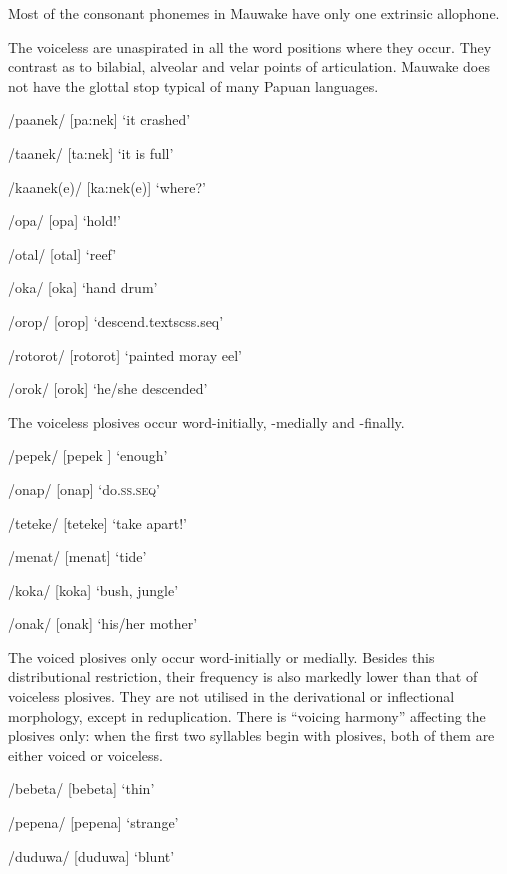 Most of the consonant phonemes in Mauwake have only one extrinsic allophone. 

The voiceless  are unaspirated in all the word positions where they occur. They contrast as to bilabial, alveolar and velar points of articulation. Mauwake does not have the glottal stop typical of many Papuan languages. 

/paanek/  [{{\textprimstress}pa:nek}]  `it crashed'

/taanek/  [{{\textprimstress}ta:nek}]  `it is full'

/kaanek(e)/  [{{\textprimstress}ka:nek(e)}]  `where?'

/opa/  [o{{\textprimstress}pa}]  `hold!'

/otal/  [o{{\textprimstress}tal}]  `reef'

/oka/  [o{{\textprimstress}ka}]  `hand drum'

/orop/  [o{{\textprimstress}rop}]  `descend.textsc{ss.seq}'

/rotorot/  [ro{{\textprimstress}torot}]  `painted moray eel'

/orok/  [o{{\textprimstress}rok}]  `he/she descended'

The voiceless plosives occur word-initially, -medially and -finally.

/pepek/  [pe{{\textprimstress}pek} ]  `enough'

/onap/  [o{{\textprimstress}nap}]  `do.\textsc{ss.seq}'

/teteke/  [te{{\textprimstress}teke}]  `take apart!'

/menat/  [me{{\textprimstress}nat}]  `tide'

/koka/  [ko{{\textprimstress}ka}]  `bush, jungle'

/onak/  [o{{\textprimstress}nak}]  `his/her mother'

The voiced plosives only occur word-initially or medially. Besides this distributional restriction, their frequency is also markedly lower than that of voiceless plosives. They are not utilised in the derivational or inflectional morphology, except in reduplication. There is ``voicing harmony'' affecting the plosives only: when the first two syllables begin with plosives, both of them are either voiced or voiceless. 

/bebeta/  [be{{\textprimstress}beta}]  `thin'

/pepena/  [pe{{\textprimstress}pena}]  `strange'

/duduwa/  [du{{\textprimstress}duwa}]  `blunt'

